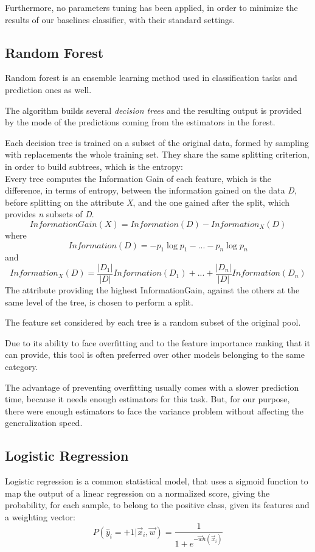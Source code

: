 Furthermore, no parameters tuning has been applied, in order to minimize the results of our baselines classifier, with their standard settings.
\subsection{Random Forest}
Random forest is an ensemble learning method used in classification tasks and prediction ones as well.

The algorithm builds several \textit{decision trees} and the resulting output is provided by the mode of the predictions coming from the estimators in the forest.

Each decision tree is trained on a subset of the original data, formed by sampling with replacements the whole training set. They share the same splitting criterion, in order to build subtrees, which is the entropy:\\
Every tree computes the Information Gain of each feature, which is the difference, in terms of entropy, between the information gained on the data \textit{D}, before splitting on the attribute \textit{X}, and the one gained after the split, which provides \textit{n} subsets of \textit{D}.
\[{ \mathit{InformationGain(X)} = \mathit{Information(D)} - \mathit{Information_{X}(D)}}\]
where
\[{ \mathit{Information(D)} = - p_{1}\log p_{1} - ... - p_{n} \log p_{n}}\]
and
\[{ \mathit{Information_{X}(D)} = \frac{|D_{1}|}{|D|}Information(D_{1}) + ... + \frac{|D_{n}|}{|D|}Information(D_{n}) }\]
The attribute providing the highest InformationGain, against the others at the same level of the tree, is chosen to perform a split.

The feature set considered by each tree is a random subset of the original pool.

Due to its ability to face overfitting and to the feature importance ranking that it can provide, this tool is often preferred over other models belonging to the same category.

The advantage of preventing overfitting usually comes with a slower prediction time, because it needs enough estimators for this task.
But, for our purpose, there were enough estimators to face the variance problem without affecting the generalization speed.
\subsection{Logistic Regression}
Logistic regression is a common statistical model, that uses a sigmoid function to map the output of a linear regression on a normalized score, giving the probability, for each sample, to belong to the positive class, given its features and a weighting vector:
\[{\displaystyle P(\hat{y}_{i} = +1 | \vec{x}_{i}, \vec{w})={\frac {1}{1+e^{-\vec{w}h(\vec{x}_{i})}}}}\]

